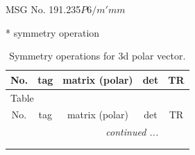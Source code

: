 \documentclass[fleqn,8pt]{jsarticle}
\begin{document}
\setcounter{MaxMatrixCols}{32}

\renewcommand{\tablename}{Table~}
\renewcommand{\figurename}{Figure~}
\begin{center}
\LARGE
MSG No. 191.235\quad$P6/m'mm$
\end{center}
* symmetry operation
\renewcommand{\arraystretch}{1.3}
\begin{longtable}{ccccc}
\caption{Symmetry operations for 3d polar vector.}
 \\
 \hline \hline
No. & tag & matrix (polar) & det & TR \\ \hline \endfirsthead

\multicolumn{4}{l}{\tablename\ \thetable{}} \\
 \hline \hline
No. & tag & matrix (polar) & det & TR \\ \hline \endhead

 \hline \hline
\multicolumn{4}{r}{\footnotesize\it continued ...} \\ \endfoot

 \hline \hline
\multicolumn{4}{r}{} \\ \endlastfoot


\end{longtable}
\end{document}
